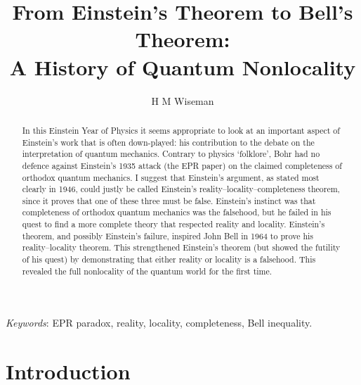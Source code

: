 \documentclass[12pt]{iopart}
\begin{document}
\title{From Einstein's Theorem to Bell's Theorem: \\ A History of Quantum Nonlocality} %

\author{H M Wiseman}

\address{Centre for Quantum Dynamics, School of Science, Griffith
University,  Brisbane,
Queensland 4111 Australia. }


\newcommand{\sch}{Schr\"odinger}
\newcommand{\hei}{Heisenberg}

\begin{abstract}
In this Einstein Year of Physics it seems appropriate to look at an important aspect of Einstein's work that is often down-played: his contribution to the debate on the interpretation of quantum mechanics. Contrary to physics `folklore', Bohr had no defence against Einstein's 1935 attack (the EPR paper) on the claimed completeness of orthodox quantum mechanics.  I suggest that Einstein's argument, as stated most clearly in 1946, could justly be called Einstein's reality--locality--completeness theorem, since it proves that one of these three must be false. Einstein's instinct was that  completeness of orthodox quantum mechanics was the falsehood, but he failed in his quest to find a more complete theory that respected reality and locality. Einstein's theorem, and possibly Einstein's failure, inspired John Bell in 1964 to prove his reality--locality theorem. This strengthened Einstein's theorem (but showed the futility of his quest) by demonstrating that either reality or locality is a falsehood. This revealed the full nonlocality of the quantum world for the first time. \end{abstract}


{\it Keywords}: EPR paradox, reality, locality, completeness, Bell inequality.

\maketitle




\section{Introduction}
\end{document}

